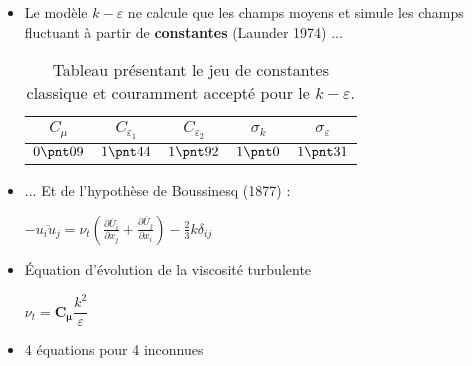 \documentclass[12pt, xcolor=svgnames]{beamer}
\newcommand{\keps}{$k-\varepsilon$}
\newcommand{\bwarrow}{\item[\color{DarkRed} \ding{227}]}
\newcommand{\bepar}[1]{
	\left( #1 \right)  
}
\begin{document}
\begin{frame}
\begin{itemize}
	\bwarrow Le modèle \keps $ $ ne calcule que les champs moyens et simule les champs fluctuant à partir de \textbf{constantes} (Launder 1974) ... \\
	
			\begin{table}[!hbt]
		\begin{center}
		\begin{tabular}{|c || c || c || c || c|}
		$C_\mu$ & $C_{\varepsilon_1}$ & $C_{\varepsilon_2}$ & $~\sigma_k~$ & $\sigma_\varepsilon$ \\
		
		\hline
		
		$0 \pnt 09 $ & $1 \pnt 44$ & $1 \pnt 92$ & $ 1 \pnt 0$ & $1 \pnt 31$
		
		\end{tabular} 
		\caption{\footnotesize{Tableau présentant le jeu de constantes classique et couramment accepté pour le \keps.}	}	
		\end{center}
		\end{table}
		
			\bwarrow ... Et de l'hypothèse de Boussinesq (1877) : \\
		\begin{center}$\displaystyle - \overline{u_iu_j} = \nu_t \bepar{\frac{\partial \overline{U}_i}{\partial x_j} + \frac{\partial \overline{U}_j}{\partial x_i}} - \frac{2}{3} k \delta_{ij} $ \end{center}

	\bwarrow Équation d'évolution de la viscosité turbulente \\
\begin{center}
			$ \displaystyle \nu_t = \boldsymbol{C_\mu} \dfrac{k^2}{\varepsilon}$
\end{center}	
	\bwarrow 4 équations pour 4 inconnues 
\end{itemize}
\end{frame}
\end{document}
